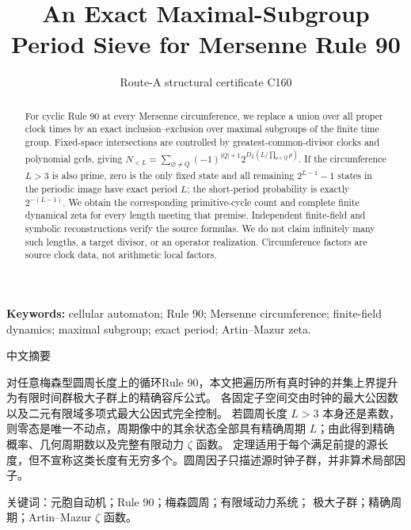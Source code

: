 \documentclass[10pt]{article}
\title{An Exact Maximal-Subgroup Period Sieve for Mersenne Rule 90}
\author{Route-A structural certificate C160}
\date{}
\begin{document}
\maketitle
\begin{abstract}
For cyclic Rule 90 at every Mersenne circumference, we replace a union over
all proper clock times by an exact inclusion--exclusion over maximal
subgroups of the finite time group.  Fixed-space intersections are controlled
by greatest-common-divisor clocks and polynomial gcds, giving
$N_{<L}=\sum_{\varnothing\ne Q}(-1)^{|Q|+1}
2^{D_L(L/\prod_{p\in Q}p)}$.  If the circumference $L>3$ is also prime,
zero is the only fixed state and all remaining $2^{L-1}-1$ states in the
periodic image have exact period $L$; the short-period probability is exactly
$2^{-(L-1)}$.  We obtain the corresponding primitive-cycle count and complete
finite dynamical zeta for every length meeting that premise.  Independent
finite-field and symbolic reconstructions verify the source formulas.  We do
not claim infinitely many such lengths, a target divisor, or an operator
realization.  Circumference factors are source clock data, not arithmetic
local factors.
\end{abstract}
\noindent\textbf{Keywords:} cellular automaton; Rule 90; Mersenne
circumference; finite-field dynamics; maximal subgroup; exact period;
Artin--Mazur zeta.

\begin{otherlanguage}{chinese-simplified}
\begin{center}{\large 中文摘要}\end{center}
\begin{sloppypar}
对任意梅森型圆周长度上的循环\foreignlanguage{english}{Rule 90}，本文把遍历所有真时钟的并集上界提升为有限时间群极大子群上的精确容斥公式。
各固定子空间交由时钟的最大公因数以及二元有限域多项式最大公因式完全控制。
若圆周长度 $L>3$ 本身还是素数，则零态是唯一不动点，周期像中的其余状态全部具有精确周期 $L$；由此得到精确概率、几何周期数以及完整有限动力 $\zeta$ 函数。
定理适用于每个满足前提的源长度，但不宣称这类长度有无穷多个。圆周因子只描述源时钟子群，并非算术局部因子。
\end{sloppypar}
\noindent 关键词：元胞自动机；\foreignlanguage{english}{Rule 90}；梅森圆周；有限域动力系统；
极大子群；精确周期；\foreignlanguage{english}{Artin--Mazur} $\zeta$ 函数。
\end{otherlanguage}
\end{document}
